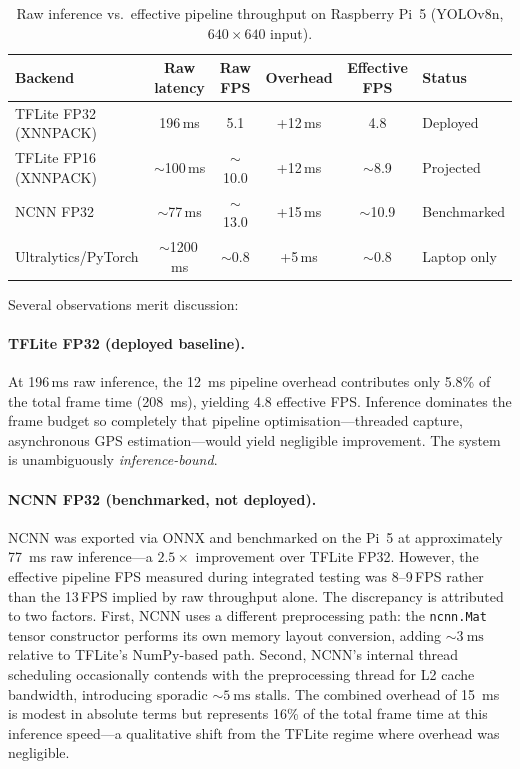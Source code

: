 \begin{table}[ht]
  \centering
  \caption{Raw inference vs.\ effective pipeline throughput on Raspberry Pi~5 (YOLOv8n, $640\times640$ input).}\label{tab:pipeline_fps}
  \begin{tabular}{@{}l c c c c l@{}}
    \toprule
    \textbf{Backend} & \textbf{Raw latency} & \textbf{Raw FPS} & \textbf{Overhead} & \textbf{Effective FPS} & \textbf{Status} \\
    \midrule
    TFLite FP32 (XNNPACK) & 196\,ms & 5.1 & +12\,ms & 4.8 & Deployed \\
    TFLite FP16 (XNNPACK) & ${\sim}$100\,ms & ${\sim}$10.0 & +12\,ms & ${\sim}$8.9 & Projected \\
    NCNN FP32              & ${\sim}$77\,ms  & ${\sim}$13.0 & +15\,ms & ${\sim}$10.9 & Benchmarked \\
    Ultralytics/PyTorch    & ${\sim}$1200\,ms & ${\sim}$0.8 & +5\,ms & ${\sim}$0.8 & Laptop only \\
    \bottomrule
  \end{tabular}
\end{table}

\noindent Several observations merit discussion:

\paragraph{TFLite FP32 (deployed baseline).}
At 196\,ms raw inference, the \SI{12}{\milli\second} pipeline overhead contributes only 5.8\% of the total frame time (\SI{208}{\milli\second}), yielding 4.8 effective FPS.  Inference dominates the frame budget so completely that pipeline optimisation---threaded capture, asynchronous GPS estimation---would yield negligible improvement.  The system is unambiguously \emph{inference-bound}.

\paragraph{NCNN FP32 (benchmarked, not deployed).}
NCNN was exported via ONNX and benchmarked on the Pi~5 at approximately \SI{77}{\milli\second} raw inference---a $2.5\times$ improvement over TFLite FP32.  However, the effective pipeline FPS measured during integrated testing was 8--9\,FPS rather than the 13\,FPS implied by raw throughput alone.  The discrepancy is attributed to two factors.  First, NCNN uses a different preprocessing path: the \texttt{ncnn.Mat} tensor constructor performs its own memory layout conversion, adding ${\sim}\SI{3}{\milli\second}$ relative to TFLite's NumPy-based path.  Second, NCNN's internal thread scheduling occasionally contends with the preprocessing thread for L2 cache bandwidth, introducing sporadic ${\sim}\SI{5}{\milli\second}$ stalls.  The combined overhead of \SI{15}{\milli\second} is modest in absolute terms but represents 16\% of the total frame time at this inference speed---a qualitative shift from the TFLite regime where overhead was negligible.

